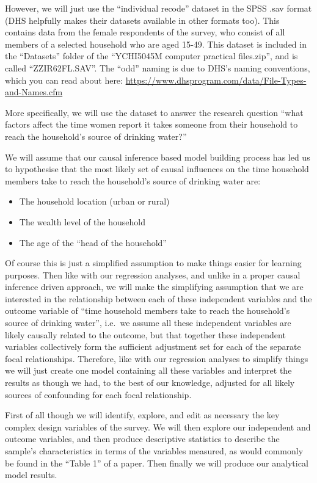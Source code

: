 \documentclass[
]{book}
\begin{document}
However, we will just use the ``individual recode'' dataset in the SPSS .sav format (DHS helpfully makes their datasets available in other formats too). This contains data from the female respondents of the survey, who consist of all members of a selected household who are aged 15-49. This dataset is included in the ``Datasets'' folder of the ``YCHI5045M computer practical files.zip'', and is called ``ZZIR62FL.SAV''. The ``odd'' naming is due to DHS's naming conventions, which you can read about here: \url{https://www.dhsprogram.com/data/File-Types-and-Names.cfm}

More specifically, we will use the dataset to answer the research question ``what factors affect the time women report it takes someone from their household to reach the household's source of drinking water?''

We will assume that our causal inference based model building process has led us to hypothesise that the most likely set of causal influences on the time household members take to reach the household's source of drinking water are:

\begin{itemize}
\item
  The household location (urban or rural)
\item
  The wealth level of the household
\item
  The age of the ``head of the household''
\end{itemize}

Of course this is just a simplified assumption to make things easier for learning purposes. Then like with our regression analyses, and unlike in a proper causal inference driven approach, we will make the simplifying assumption that we are interested in the relationship between each of these independent variables and the outcome variable of ``time household members take to reach the household's source of drinking water'', i.e.~we assume all these independent variables are likely causally related to the outcome, but that together these independent variables collectively form the sufficient adjustment set for each of the separate focal relationships. Therefore, like with our regression analyses to simplify things we will just create one model containing all these variables and interpret the results as though we had, to the best of our knowledge, adjusted for all likely sources of confounding for each focal relationship.

First of all though we will identify, explore, and edit as necessary the key complex design variables of the survey. We will then explore our independent and outcome variables, and then produce descriptive statistics to describe the sample's characteristics in terms of the variables measured, as would commonly be found in the ``Table 1'' of a paper. Then finally we will produce our analytical model results.
\end{document}
